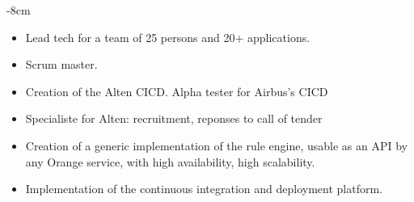 \documentclass[10pt,a4paper]{altacv}
\begin{document}

\begin{adjustwidth}{}{-8cm}
\makecvheader
\end{adjustwidth}

\begin{itemize}
\item Lead tech for a team of 25 persons and 20+ applications.
\item Scrum master.
\item Creation of the Alten CICD. Alpha tester for Airbus's CICD
\item Specialiste for Alten: recruitment, reponses to call of tender
\end{itemize}
\divider

\begin{itemize}
\item Creation of a generic implementation of the rule engine, usable as an API by any Orange service, with high availability, high scalability.
\item Implementation of the continuous integration and deployment platform.
\end{itemize}
\end{document}
